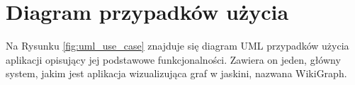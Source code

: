 \section{Diagram przypadków użycia}
Na Rysunku \ref{fig:uml_use_case} znajduje się diagram UML przypadków użycia aplikacji opisujący jej podstawowe funkcjonalności. Zawiera on jeden, główny system, jakim jest aplikacja wizualizująca graf w jaskini, nazwana WikiGraph.

